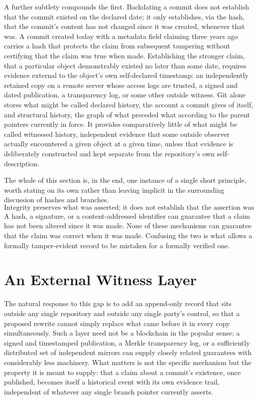 \documentclass[11pt]{article}
\begin{document}
A further subtlety compounds the first. Backdating a commit does not establish that the commit existed on the declared date; it only establishes, via the hash, that the commit's content has not changed since it was created, whenever that was. A commit created today with a metadata field claiming three years ago carries a hash that protects the claim from subsequent tampering without certifying that the claim was true when made. Establishing the stronger claim, that a particular object demonstrably existed no later than some date, requires evidence external to the object's own self-declared timestamp: an independently retained copy on a remote server whose access logs are trusted, a signed and dated publication, a transparency log, or some other outside witness. Git alone stores what might be called declared history, the account a commit gives of itself, and structural history, the graph of what preceded what according to the parent pointers currently in force. It provides comparatively little of what might be called witnessed history, independent evidence that some outside observer actually encountered a given object at a given time, unless that evidence is deliberately constructed and kept separate from the repository's own self-description.

The whole of this section is, in the end, one instance of a single short principle, worth stating on its own rather than leaving implicit in the surrounding discussion of hashes and branches.
\[
\boxed{\text{Integrity preserves what was asserted; it does not establish that the assertion was true.}}
\]
A hash, a signature, or a content-addressed identifier can guarantee that a claim has not been altered since it was made. None of these mechanisms can guarantee that the claim was correct when it was made. Confusing the two is what allows a formally tamper-evident record to be mistaken for a formally verified one.

\section{An External Witness Layer}

The natural response to this gap is to add an append-only record that sits outside any single repository and outside any single party's control, so that a proposed rewrite cannot simply replace what came before it in every copy simultaneously. Such a layer need not be a blockchain in the popular sense; a signed and timestamped publication, a Merkle transparency log, or a sufficiently distributed set of independent mirrors can supply closely related guarantees with considerably less machinery. What matters is not the specific mechanism but the property it is meant to supply: that a claim about a commit's existence, once published, becomes itself a historical event with its own evidence trail, independent of whatever any single branch pointer currently asserts.
\end{document}
